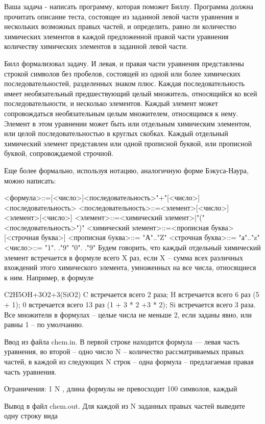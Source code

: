 \documentclass[]{article}
\begin{document}
Ваша задача - написать программу, которая поможет Биллу. Программа должна прочитать описание теста, состоящее из заданной левой части уравнения и нескольких возможных правых частей, и определить, равно ли количество химических элементов в каждой предложенной правой части уравнения количеству химических элементов в заданной левой части.

Билл формализовал задачу. И левая, и правая части уравнения представлены строкой символов без пробелов, состоящей из одной или более химических последовательностей, разделенных знаком плюс. Каждая последовательность имеет необязательный предшествующий целый множитель, относящийся ко всей последовательности, и несколько элементов. Каждый элемент может сопровождаться необязательным целым множителем, относящимся к нему. Элемент в этом уравнении может быть или отдельным химическим элементом, или целой последовательностью в круглых скобках. Каждый отдельный химический элемент представлен или одной прописной буквой, или прописной буквой, сопровождаемой строчной.

Еще более формально, используя нотацию, аналогичную форме Бэкуса-Наура, можно написать:

<формула>::=[<число>]<последовательность>{"+"[<число>]<последовательность>}
<последовательность>::=<элемент>[<число>]{<элемент>[<число>]} 
<элемент>::=<химический элемент>|"("<последовательность>")" 
<химический элемент>::=<прописная буква>[<строчная буква>] 
<прописная 6уква>::= "А".."Z" 
<строчная буква>::= "а".."z" 
<число>::= "1". ."9" {"0". ."9"}
Будем говорить, что каждый отдельный химический элемент встречается в формуле всего X раз, если X – сумма всех различных вхождений этого химического элемента, умноженных на все числа, относящиеся к ним. Например, в формуле

C2H5OH+3O2+3(SiO2)
C встречается всего 2 раза;
H встречается всего 6 раз (5 + 1);
0 встречается всего 13 раз (1 + 3 * 2 +3 * 2);
Si встречается всего 3 раза.
Все множители в формулах – целые числа не меньше 2, если заданы явно, или равны 1 – по умолчанию.

Ввод из файла chem.in. В первой строке находится формула — левая часть уравнения, во второй – одно число N – количество рассматриваемых правых частей, в каждой из следующих N строк – одна формула – предлагаемая правая часть уравнения.

Ограничения: 1 \leq N , длина формулы не превосходит 100 символов, каждый

Вывод в файл chem.out. Для каждой из N заданных правых частей выведите одну строку вида
\end{document}
